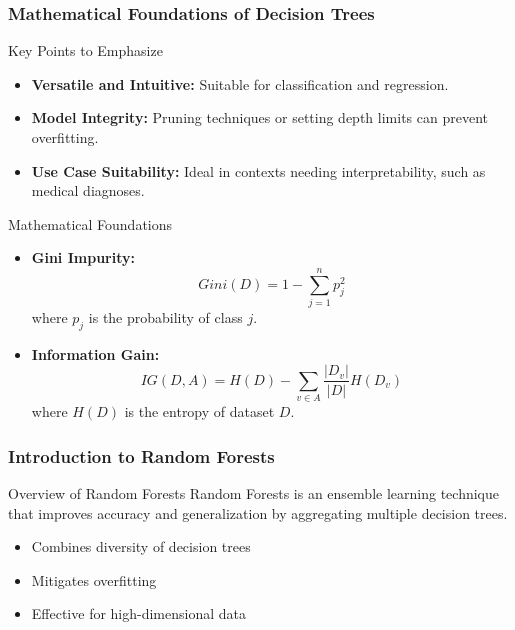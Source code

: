 \documentclass[aspectratio=169]{beamer}
\begin{document}
\begin{frame}[fragile]
    \frametitle{Mathematical Foundations of Decision Trees}

    \begin{block}{Key Points to Emphasize}
        \begin{itemize}
            \item \textbf{Versatile and Intuitive:} Suitable for classification and regression.
            \item \textbf{Model Integrity:} Pruning techniques or setting depth limits can prevent overfitting.
            \item \textbf{Use Case Suitability:} Ideal in contexts needing interpretability, such as medical diagnoses.
        \end{itemize}
    \end{block}

    \begin{block}{Mathematical Foundations}
        \begin{itemize}
            \item \textbf{Gini Impurity:} 
            \[
            Gini(D) = 1 - \sum_{j=1}^{n} p_j^2
            \]
            where \( p_j \) is the probability of class \( j \).

            \item \textbf{Information Gain:}
            \[
            IG(D, A) = H(D) - \sum_{v \in A} \frac{|D_v|}{|D|} H(D_v)
            \]
            where \( H(D) \) is the entropy of dataset \( D \).
        \end{itemize}
    \end{block}
\end{frame}

\begin{frame}[fragile]
    \frametitle{Introduction to Random Forests}
    \begin{block}{Overview of Random Forests}
        Random Forests is an ensemble learning technique that improves accuracy and generalization by aggregating multiple decision trees.
    \end{block}
    \begin{itemize}
        \item Combines diversity of decision trees
        \item Mitigates overfitting
        \item Effective for high-dimensional data
    \end{itemize}
\end{frame}
\end{document}
